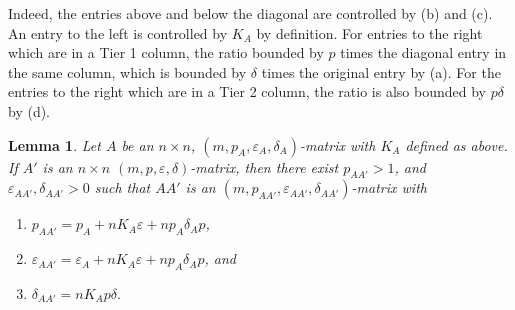 \documentclass[11pt, letterpaper]{amsart}
\theoremstyle{plain}
\newtheorem{lemma}[theorem]{Lemma}
\theoremstyle{definition}
\renewcommand{\epsilon}{\varepsilon}
\newcommand{\eps}{\epsilon}
\begin{document}
Indeed, the entries above and below the diagonal are controlled by (b) and
(c). An entry to the left is controlled by $K_A$ by definition. For
entries to the right which are in a Tier 1 column, the ratio bounded by $p$ times the
diagonal entry in the same column, which is bounded by $\delta$ times the
original entry by (a). For the entries to the right which are in a Tier 2 column, the ratio is
also bounded by $p\delta$ by (d).  

\begin{lemma}  \label{lem:matrixproduct}
  Let $A$ be an $n \times n$, $(m,p_A,\eps_A,\delta_A)$-matrix with
  $K_A$ defined 
  as above. If $A'$ is an $n \times n$ $(m, p, \epsilon, \delta)$-matrix, then there exist $p_{AA'}>1$, and $\eps_{AA'}, \delta_{AA'}>0$ such that $AA'$ is an
  $(m,p_{AA'}, \eps_{AA'},\delta_{AA'})$-matrix with
  \begin{enumerate}[label=(\arabic*)]
  \item $p_{AA'} = p_A + nK_A\eps + np_A\delta_Ap$,
  \item $\eps_{AA'} = \eps_A + nK_A\eps + np_A\delta_Ap$, and
  \item $\delta_{AA'} = nK_Ap\delta.$
  \end{enumerate}
\end{lemma}
\end{document}

